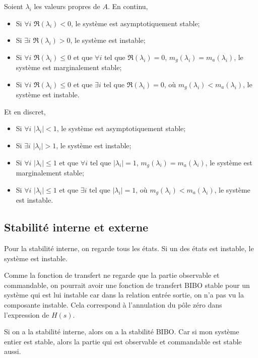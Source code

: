 Soient $\lambda_i$ les valeurs propres de $A$.
En continu,
\begin{itemize}
  \item Si $\forall i$ $\Re(\lambda_i) < 0$, le système est asymptotiquement
    stable;
  \item Si $\exists i$ $\Re(\lambda_i) > 0$, le système est instable;
  \item Si $\forall i$ $\Re(\lambda_i) \leq 0$ et que $\forall i$ tel que
    $\Re(\lambda_i) = 0$, $m_g(\lambda_i) = m_a(\lambda_i)$,
    le système est marginalement stable;
  \item Si $\forall i$ $\Re(\lambda_i) \leq 0$ et que $\exists i$ tel que
    $\Re(\lambda_i) = 0$, où $m_g(\lambda_i) < m_a(\lambda_i)$,
    le système est instable.
\end{itemize}

Et en discret,
\begin{itemize}
  \item Si $\forall i$ $|\lambda_i| < 1$, le système est asymptotiquement
    stable;
  \item Si $\exists i$ $|\lambda_i| > 1$, le système est instable;
  \item Si $\forall i$ $|\lambda_i| \leq 1$ et que $\forall i$ tel que
    $|\lambda_i| = 1$, $m_g(\lambda_i) = m_a(\lambda_i)$,
    le système est marginalement stable;
  \item Si $\forall i$ $|\lambda_i| \leq 1$ et que $\exists i$ tel que
    $|\lambda_i| = 1$, où $m_g(\lambda_i) < m_a(\lambda_i)$,
    le système est instable.
\end{itemize}

\subsection{Stabilité interne et externe}
Pour la stabilité interne, on regarde tous les états.
Si un des états est instable, le système est instable.

Comme la fonction de transfert ne regarde que
la partie observable et commandable,
on pourrait avoir une fonction de transfert
BIBO stable pour un système qui est
lui instable car dans la relation entrée sortie,
on n'a pas vu la composante instable.
Cela correspond à l'annulation du pôle zéro dans l'expression de $H(s)$.

Si on a la stabilité interne, alors on a la stabilité BIBO.
Car si mon système entier est stable,
alors la partie qui est observable et commandable est stable aussi.

